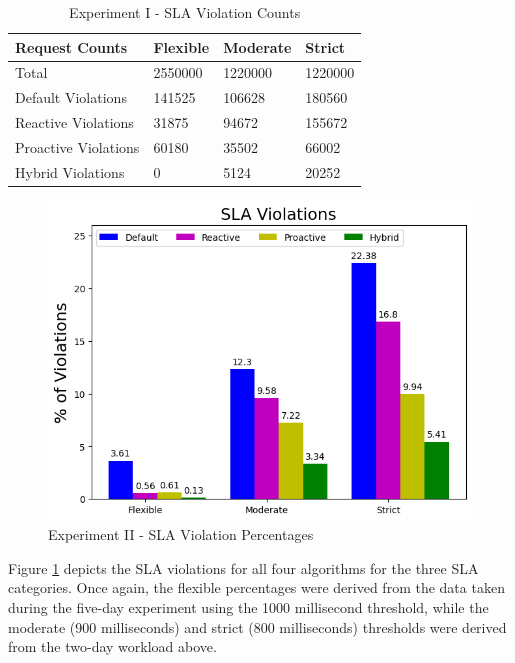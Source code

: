 \begin{table}
    \caption{Experiment I - SLA Violation Counts}\label{tab:exp1-sla-violation-count}
    \centering
    \begin{tabular}{|l|l|l|l|}
        \hline
        Request Counts & Flexible & Moderate & Strict \\
        \hline
        Total  & \num[group-separator={,}]{2550000} & \num[group-separator={,}]{1220000} & \num[group-separator={,}]{1220000} \\
        Default Violations & \num[group-separator={,}]{141525} & \num[group-separator={,}]{106628} & \num[group-separator={,}]{180560} \\
        Reactive Violations & \num[group-separator={,}]{31875} & \num[group-separator={,}]{94672} & \num[group-separator={,}]{155672} \\
        Proactive Violations & \num[group-separator={,}]{60180} & \num[group-separator={,}]{35502} & \num[group-separator={,}]{66002} \\
        Hybrid Violations & \num[group-separator={,}]{0} & \num[group-separator={,}]{5124} & \num[group-separator={,}]{20252} \\
         \hline
    \end{tabular}
\end{table}

\begin{figure}[htb]
    \centering
    \caption{Experiment II - SLA Violation Percentages}
    \label{fig:exp2-sla-violation-bar}
    \includegraphics[width=0.6\linewidth]{Figures/Compose-Post-SLA-Violations.png}
\end{figure}

Figure \ref{fig:exp2-sla-violation-bar} depicts the SLA violations for all four algorithms for the three SLA categories. Once again, the flexible percentages were derived from the data taken during the five-day experiment using the 1000 millisecond threshold, while the moderate (900 milliseconds) and strict (800 milliseconds) thresholds were derived from the two-day workload above.\par

